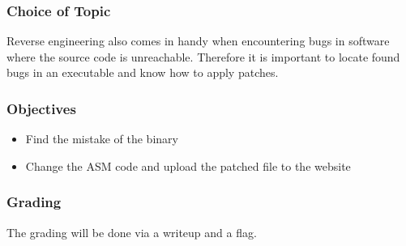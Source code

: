 \subsubsection*{Choice of Topic}
Reverse engineering also comes in handy when encountering bugs in software where the source code is unreachable. Therefore it is important to locate found bugs in an executable and know how to apply patches.
\subsubsection*{Objectives}
\begin{itemize}
    \item Find the mistake of the binary
    \item Change the ASM code and upload the patched file to the website
\end{itemize}
\subsubsection*{Grading}
The grading will be done via a writeup and a flag.
\pagebreak
